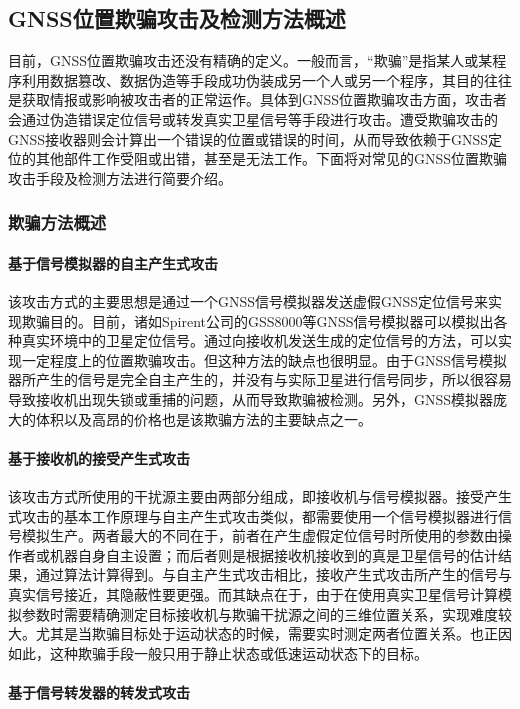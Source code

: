 \subsection{GNSS位置欺骗攻击及检测方法概述}
目前，GNSS位置欺骗攻击还没有精确的定义。一般而言，“欺骗”是指某人或某程序利用数据篡改、数据伪造等手段成功伪装成另一个人或另一个程序，其目的往往是获取情报或影响被攻击者的正常运作。具体到GNSS位置欺骗攻击方面，攻击者会通过伪造错误定位信号或转发真实卫星信号等手段进行攻击。遭受欺骗攻击的GNSS接收器则会计算出一个错误的位置或错误的时间，从而导致依赖于GNSS定位的其他部件工作受阻或出错，甚至是无法工作。下面将对常见的GNSS位置欺骗攻击手段及检测方法进行简要介绍。
\subsubsection{欺骗方法概述}
\paragraph{基于信号模拟器的自主产生式攻击}

该攻击方式的主要思想是通过一个GNSS信号模拟器发送虚假GNSS定位信号来实现欺骗目的。目前，诸如Spirent公司的GSS8000等GNSS信号模拟器可以模拟出各种真实环境中的卫星定位信号。通过向接收机发送生成的定位信号的方法，可以实现一定程度上的位置欺骗攻击。但这种方法的缺点也很明显。由于GNSS信号模拟器所产生的信号是完全自主产生的，并没有与实际卫星进行信号同步，所以很容易导致接收机出现失锁或重捕的问题，从而导致欺骗被检测。另外，GNSS模拟器庞大的体积以及高昂的价格也是该欺骗方法的主要缺点之一。
\paragraph{基于接收机的接受产生式攻击}

该攻击方式所使用的干扰源主要由两部分组成，即接收机与信号模拟器。接受产生式攻击的基本工作原理与自主产生式攻击类似，都需要使用一个信号模拟器进行信号模拟生产。两者最大的不同在于，前者在产生虚假定位信号时所使用的参数由操作者或机器自身自主设置；而后者则是根据接收机接收到的真是卫星信号的估计结果，通过算法计算得到。与自主产生式攻击相比，接收产生式攻击所产生的信号与真实信号接近，其隐蔽性要更强。而其缺点在于，由于在使用真实卫星信号计算模拟参数时需要精确测定目标接收机与欺骗干扰源之间的三维位置关系，实现难度较大。尤其是当欺骗目标处于运动状态的时候，需要实时测定两者位置关系。也正因如此，这种欺骗手段一般只用于静止状态或低速运动状态下的目标。
\paragraph{基于信号转发器的转发式攻击}
\label{par:zhuanfa}


